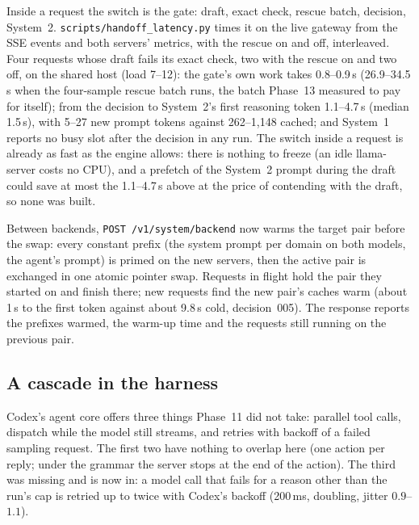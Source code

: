 Inside a request the switch is the gate: draft, exact check, rescue batch, decision, System~2. \texttt{scripts/handoff\_latency.py}
times it on the live gateway from the SSE events and both servers' metrics, with the rescue on and off, interleaved.
Four requests whose draft fails its exact check, two with the rescue on and two off, on the shared host (load 7--12): the gate's
own work takes 0.8--0.9\,s (26.9--34.5\,s when the four-sample rescue batch runs, the batch Phase~13 measured to pay for
itself); from the decision to System~2's first reasoning token 1.1--4.7\,s (median 1.5\,s), with 5--27 new prompt tokens against
262--1,148 cached; and System~1 reports no busy slot after the decision in any run. The switch inside a request is already as
fast as the engine allows: there is nothing to freeze (an idle llama-server costs no CPU), and a prefetch of the System~2
prompt during the draft could save at most the 1.1--4.7\,s above at the price of contending with the draft, so none was built.

Between backends, \texttt{POST /v1/system/backend} now warms the target pair before the swap: every constant prefix (the
system prompt per domain on both models, the agent's prompt) is primed on the new servers, then the active pair is exchanged in
one atomic pointer swap. Requests in flight hold the pair they started on and finish there; new requests find the new pair's
caches warm (about 1\,s to the first token against about 9.8\,s cold, decision~005). The response reports the prefixes warmed,
the warm-up time and the requests still running on the previous pair.

\subsection{A cascade in the harness}
\label{sec:p14-cascade}

Codex's agent core offers three things Phase~11 did not take: parallel tool calls, dispatch while the model still streams, and
retries with backoff of a failed sampling request. The first two have nothing to overlap here (one action per reply; under the
grammar the server stops at the end of the action). The third was missing and is now in: a model call that fails for a reason
other than the run's cap is retried up to twice with Codex's backoff (200\,ms, doubling, jitter $0.9$--$1.1$).

